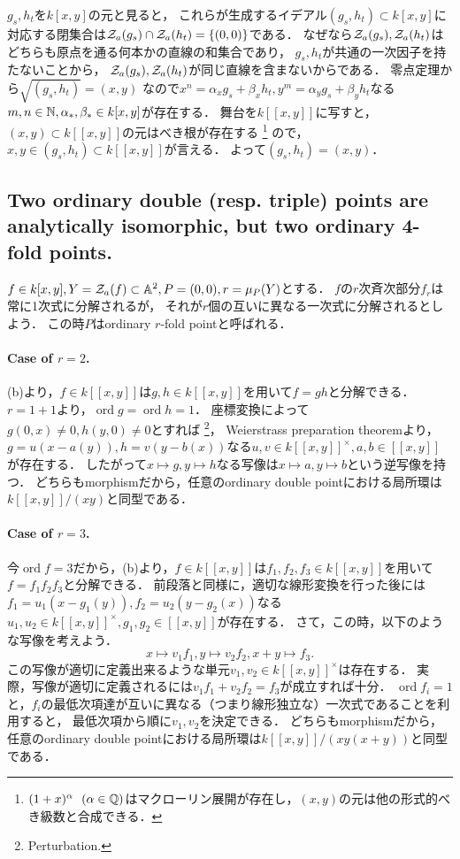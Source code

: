 \documentclass[a4paper]{jsarticle}
\newcommand{\ord}{\operatorname{ord}}
\begin{document}
    $g_s, h_t$を$k[x,y]$の元と見ると，
    これらが生成するイデアル$(g_s,h_t) \subset k[x,y]$に対応する閉集合は$\mathcal{Z}_a(g_s) \cap \mathcal{Z}_a(h_t)=\{(0,0)\}$である．
    なぜなら$\mathcal{Z}_a(g_s), \mathcal{Z}_a(h_t)$はどちらも原点を通る何本かの直線の和集合であり，
    $g_{s}, h_{t}$が共通の一次因子を持たないことから，
    $\mathcal{Z}_a(g_s), \mathcal{Z}_a(h_t)$が同じ直線を含まないからである．
    零点定理から$\sqrt{(g_s,h_t)}=(x,y)$
    なので$x^n=\alpha_x g_s+\beta_x h_t, y^m=\alpha_y g_s+\beta_y h_t$なる
    $m,n \in \mathbb{N}, \alpha_{\ast}, \beta_{\ast} \in k[x,y]$が存在する．
    舞台を$k[[x,y]]$に写すと，
    $(x,y) \subset k[[x,y]]$の元はべき根が存在する
    \footnote{$(1+x)^{\alpha} ~~(\alpha \in \mathbb{Q})$はマクローリン展開が存在し，$(x,y)$の元は他の形式的べき級数と合成できる．}
    ので，
    $x,y \in (g_s,h_t) \subset k[[x,y]]$が言える．
    よって$(g_s,h_t)=(x,y)$．

    \subsection{Two ordinary double (resp. triple) points are analytically isomorphic, but two ordinary 4-fold points.}
    $f \in k[x,y], Y=\mathcal{Z}_a(f) \subset \mathbb{A}^2, P=(0,0), r=\mu_P(Y)$とする．
    $f$の$r$次斉次部分$f_r$は常に1次式に分解されるが，
    それが$r$個の互いに異なる一次式に分解されるとしよう．
    この時$P$はordinary $r$-fold pointと呼ばれる．
    
    \paragraph{Case of $r=2$.}
    (b)より，$f \in k[[x,y]]$は$g,h \in k[[x,y]]$を用いて$f=gh$と分解できる．
    $r=1+1$より，$\ord g=\ord h=1$．
    座標変換によって$g(0,x) \neq 0, h(y,0) \neq 0$とすれば \footnote{Perturbation.}，
    Weierstrass preparation theoremより，
    $g=u(x-a(y)), h=v(y-b(x))$なる$u,v \in k[[x,y]]^{\times}, a,b \in [[x,y]]$が存在する．
    したがって$x \mapsto g, y \mapsto h$なる写像は$x \mapsto a, y \mapsto b$という逆写像を持つ．
    どちらもmorphismだから，任意のordinary double pointにおける局所環は$k[[x,y]]/(xy)$と同型である．

    \paragraph{Case of $r=3$.}
    今$\ord f=3$だから，(b)より，$f \in k[[x,y]]$は$f_1, f_2, f_3 \in k[[x,y]]$を用いて$f=f_1 f_2 f_3$と分解できる．
    前段落と同様に，適切な線形変換を行った後には
    $f_1=u_1 (x-g_1(y)), f_2= u_2(y-g_2(x))$なる$u_1,u_2 \in k[[x,y]]^{\times}, g_1, g_2 \in [[x,y]]$が存在する．
    さて，この時，以下のような写像を考えよう．
    \[ x \mapsto v_1 f_1, y \mapsto v_2 f_2, x+y \mapsto f_3. \]
    この写像が適切に定義出来るような単元$v_1, v_2 \in k[[x,y]]^{\times}$は存在する．
    実際，写像が適切に定義されるには$v_1 f_1+v_2 f_2=f_3$が成立すれば十分．
    $\ord f_i=1$と，$f_i$の最低次項達が互いに異なる（つまり線形独立な）一次式であることを利用すると，
    最低次項から順に$v_1, v_2$を決定できる．
    どちらもmorphismだから，任意のordinary double pointにおける局所環は$k[[x,y]]/(xy(x+y))$と同型である．
\end{document}
